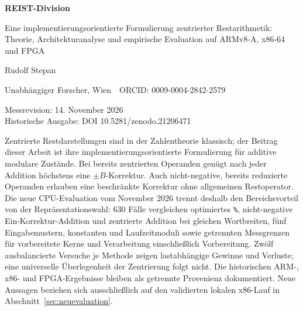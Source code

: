 \documentclass[11pt,a4paper]{scrartcl}
\theoremstyle{definition}
\theoremstyle{plain}
\theoremstyle{remark}
\renewenvironment{abstract}{%
  \begin{center}\normalfont\bfseries\abstractname\end{center}%
  \vspace{-0.4em}%
  \begin{list}{}{\setlength{\leftmargin}{2em}\setlength{\rightmargin}{2em}}%
  \item\relax\small
}{\end{list}}
\begin{document}
\begin{center}
  {\LARGE\bfseries REIST-Division\par}
  \vspace{0.5em}
  {\large Eine implementierungsorientierte Formulierung zentrierter Restarithmetik:\\
   Theorie, Architekturanalyse und empirische Evaluation auf ARMv8-A, x86-64 und FPGA\par}
  \vspace{1.6em}
  {Rudolf Stepan\par}
  \vspace{0.2em}
  {\small Unabhängiger Forscher, Wien \,\textperiodcentered\, ORCID: 0009-0004-2842-2579\par}
  \vspace{0.8em}
  {\small Messrevision: 14. November 2026\\Historische Ausgabe: DOI 10.5281/zenodo.21206471\par}
\end{center}
\vspace{1.2em}
\thispagestyle{plain}

\begin{abstract}
\noindent
Zentrierte Restdarstellungen sind in der Zahlentheorie klassisch; der Beitrag
dieser Arbeit ist ihre implementierungsorientierte Formulierung für additive
modulare Zustände. Bei bereits zentrierten Operanden genügt nach jeder Addition
höchstens eine $\pm B$-Korrektur. Auch nicht-negative, bereits reduzierte
Operanden erlauben eine beschränkte Korrektur ohne allgemeinen Restoperator.
Die neue CPU-Evaluation vom November 2026 trennt deshalb den Bereichsvorteil
von der Repräsentationswahl: 630 Fälle vergleichen optimiertes \texttt{\%},
nicht-negative Ein-Korrektur-Addition und zentrierte Addition bei gleichen
Wortbreiten, fünf Eingabemustern, konstanten und Laufzeitmoduli sowie getrennten
Messgrenzen für vorbereitete Kerne und Verarbeitung einschließlich Vorbereitung.
Zwölf ausbalancierte Versuche je Methode zeigen lastabhängige Gewinne und
Verluste; eine universelle Überlegenheit der Zentrierung folgt nicht.
Die historischen ARM-, x86- und FPGA-Ergebnisse bleiben als getrennte
Provenienz dokumentiert. Neue Aussagen beziehen sich ausschließlich auf den
validierten lokalen x86-Lauf in Abschnitt~\ref{sec:neuevaluation}.
\end{abstract}
\end{document}
